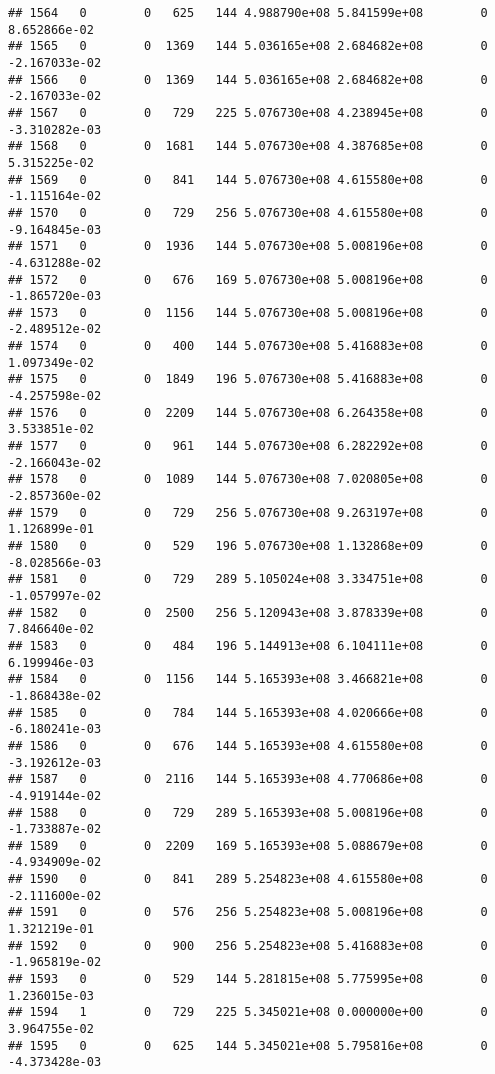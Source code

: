 \documentclass[
]{article}
\begin{document}
\begin{enumerate}
\begin{verbatim}
## 1564   0        0   625   144 4.988790e+08 5.841599e+08        0  8.652866e-02
## 1565   0        0  1369   144 5.036165e+08 2.684682e+08        0 -2.167033e-02
## 1566   0        0  1369   144 5.036165e+08 2.684682e+08        0 -2.167033e-02
## 1567   0        0   729   225 5.076730e+08 4.238945e+08        0 -3.310282e-03
## 1568   0        0  1681   144 5.076730e+08 4.387685e+08        0  5.315225e-02
## 1569   0        0   841   144 5.076730e+08 4.615580e+08        0 -1.115164e-02
## 1570   0        0   729   256 5.076730e+08 4.615580e+08        0 -9.164845e-03
## 1571   0        0  1936   144 5.076730e+08 5.008196e+08        0 -4.631288e-02
## 1572   0        0   676   169 5.076730e+08 5.008196e+08        0 -1.865720e-03
## 1573   0        0  1156   144 5.076730e+08 5.008196e+08        0 -2.489512e-02
## 1574   0        0   400   144 5.076730e+08 5.416883e+08        0  1.097349e-02
## 1575   0        0  1849   196 5.076730e+08 5.416883e+08        0 -4.257598e-02
## 1576   0        0  2209   144 5.076730e+08 6.264358e+08        0  3.533851e-02
## 1577   0        0   961   144 5.076730e+08 6.282292e+08        0 -2.166043e-02
## 1578   0        0  1089   144 5.076730e+08 7.020805e+08        0 -2.857360e-02
## 1579   0        0   729   256 5.076730e+08 9.263197e+08        0  1.126899e-01
## 1580   0        0   529   196 5.076730e+08 1.132868e+09        0 -8.028566e-03
## 1581   0        0   729   289 5.105024e+08 3.334751e+08        0 -1.057997e-02
## 1582   0        0  2500   256 5.120943e+08 3.878339e+08        0  7.846640e-02
## 1583   0        0   484   196 5.144913e+08 6.104111e+08        0  6.199946e-03
## 1584   0        0  1156   144 5.165393e+08 3.466821e+08        0 -1.868438e-02
## 1585   0        0   784   144 5.165393e+08 4.020666e+08        0 -6.180241e-03
## 1586   0        0   676   144 5.165393e+08 4.615580e+08        0 -3.192612e-03
## 1587   0        0  2116   144 5.165393e+08 4.770686e+08        0 -4.919144e-02
## 1588   0        0   729   289 5.165393e+08 5.008196e+08        0 -1.733887e-02
## 1589   0        0  2209   169 5.165393e+08 5.088679e+08        0 -4.934909e-02
## 1590   0        0   841   289 5.254823e+08 4.615580e+08        0 -2.111600e-02
## 1591   0        0   576   256 5.254823e+08 5.008196e+08        0  1.321219e-01
## 1592   0        0   900   256 5.254823e+08 5.416883e+08        0 -1.965819e-02
## 1593   0        0   529   144 5.281815e+08 5.775995e+08        0  1.236015e-03
## 1594   1        0   729   225 5.345021e+08 0.000000e+00        0  3.964755e-02
## 1595   0        0   625   144 5.345021e+08 5.795816e+08        0 -4.373428e-03

\end{verbatim}
\end{enumerate}
\end{document}
